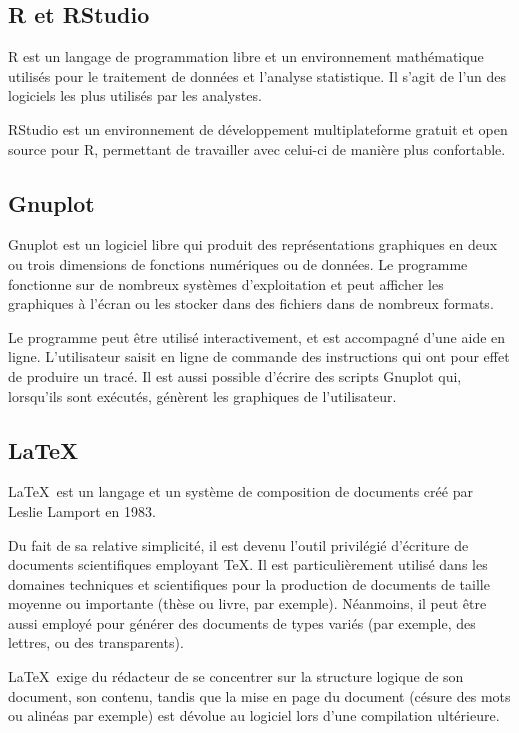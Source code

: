 		
	\subsection{R et RStudio}
		R est un langage de programmation libre et un environnement mathématique utilisés pour le traitement de données et l'analyse statistique. Il s'agit de l'un des logiciels les plus utilisés par les analystes.
		
		RStudio est un environnement de développement multiplateforme gratuit et open source pour R, permettant de travailler avec celui-ci de manière plus confortable.


	\subsection{Gnuplot}
		Gnuplot est un logiciel libre qui produit des représentations graphiques en deux ou trois dimensions de fonctions numériques ou de données. Le programme fonctionne sur de nombreux systèmes d'exploitation et peut afficher les graphiques à l'écran ou les stocker dans des fichiers dans de nombreux formats.
		
		Le programme peut être utilisé interactivement, et est accompagné d'une aide en ligne. L'utilisateur saisit en ligne de commande des instructions qui ont pour effet de produire un tracé. Il est aussi possible d'écrire des scripts Gnuplot qui, lorsqu'ils sont exécutés, génèrent les graphiques de l'utilisateur.
	
	
	\subsection{\LaTeX}
		\LaTeX~est un langage et un système de composition de documents créé par Leslie Lamport en 1983.

		Du fait de sa relative simplicité, il est devenu l'outil privilégié d'écriture de documents scientifiques employant TeX. Il est particulièrement utilisé dans les domaines techniques et scientifiques pour la production de documents de taille moyenne ou importante (thèse ou livre, par exemple). Néanmoins, il peut être aussi employé pour générer des documents de types variés (par exemple, des lettres, ou des transparents).
		
		\LaTeX~exige du rédacteur de se concentrer sur la structure logique de son document, son contenu, tandis que la mise en page du document (césure des mots ou alinéas par exemple) est dévolue au logiciel lors d'une compilation ultérieure.
		
